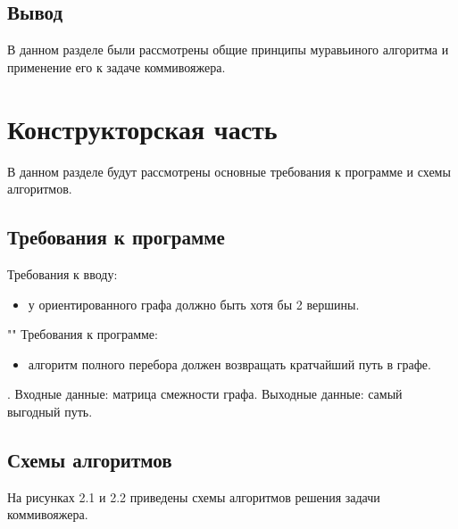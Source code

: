 \documentclass[12pt]{report}
\begin{document}
	
\section*{Вывод}
В данном разделе были рассмотрены общие принципы муравьиного алгоритма и применение его к задаче коммивояжера. 

\newpage
\chapter{Конструкторская часть}
В данном разделе будут рассмотрены основные требования к программе и схемы алгоритмов.

\section{Требования к программе}
\noindent Требования к вводу:
\begin{itemize}
	\item у ориентированного графа должно быть хотя бы 2 вершины.
\end{itemize}

""\newline
Требования к программе:
\begin{itemize}
	\item алгоритм полного перебора должен возвращать кратчайший путь в графе.
\end{itemize}
 .  
\newline  
Входные данные: матрица смежности графа.  
\newline
Выходные данные: самый выгодный путь.

\section{Схемы алгоритмов}
На рисунках 2.1 и 2.2 приведены схемы алгоритмов решения задачи коммивояжера.
\end{document}
